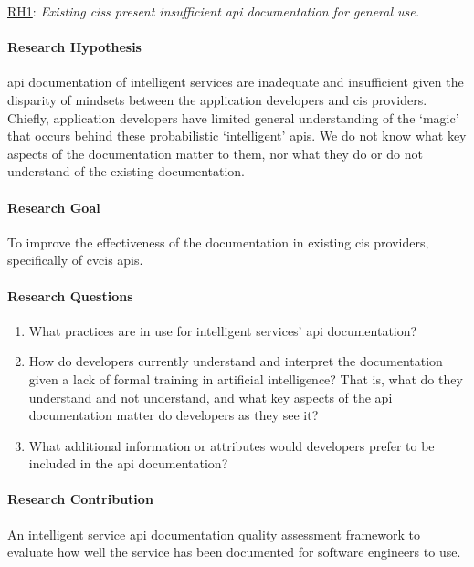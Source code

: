 \begin{titled-frame}{\underline{RH1}: \textit{Existing \glspl{cis} present insufficient \gls{api} documentation for general use.} }
\vspace{-12pt}
\paragraph{Research Hypothesis}
\gls{api} documentation of intelligent services are inadequate and insufficient given the disparity of mindsets between the application developers and \gls{cis} providers. Chiefly, application developers have limited general understanding of the `magic' that occurs behind these probabilistic `intelligent' \glspl{api}. We do not know what key aspects of the documentation matter to them, nor what they do or do not understand of the existing documentation.

\paragraph{Research Goal}
To improve the effectiveness of the documentation in existing \gls{cis} providers, specifically of \gls{cvcis} \glspl{api}.

\paragraph{Research Questions}
\begin{enumerate}[label=\textbf{RQ1.\arabic*.}, ref=RQ1.\arabic*, leftmargin=3.5\parindent, rightmargin=1\parindent]
  \item What practices are in use for intelligent services' \gls{api} documentation? 
  \label{rqs:apidoc:what-is-in-use}
  
  \item How do developers currently understand and interpret the documentation given a lack of formal training in artificial intelligence? That is, what do they understand and not understand, and what key aspects of the \gls{api} documentation matter do developers as they see it?
  \label{rqs:apidoc:how-do-devs-understand-it}
  
  \item What additional information or attributes would developers prefer to be included in the \gls{api} documentation?
  \label{rqs:apidoc:what-additional-information-needed}
\end{enumerate}

\paragraph{Research Contribution} An intelligent service \gls{api} documentation quality assessment framework to evaluate how well the service has been documented for software engineers to use.

\end{titled-frame}

